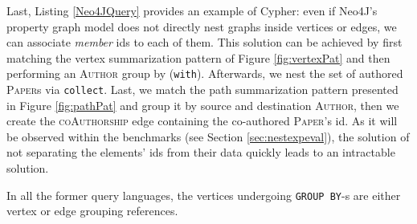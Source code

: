 Last, Listing \ref{Neo4JQuery} provides an example of Cypher: even if Neo4J's property graph model does not directly nest graphs inside vertices or edges, we can associate \textit{member} ids to each of them. This solution can be achieved by  first matching the vertex summarization pattern of Figure \ref{fig:vertexPat} and then performing an \textsc{Author} group by (\texttt{with}). Afterwards, we nest the set of authored \textsc{Paper}s via \texttt{collect}. Last, we match the path summarization pattern presented in Figure \ref{fig:pathPat} and group it by source and destination \textsc{Author}, then we create the \textsc{coAuthorship} edge containing the co-authored \textsc{Paper}'s id. As it will be observed within the benchmarks (see Section \ref{sec:nestexpeval}), the solution of not separating the elements' ids from their data quickly leads to an intractable solution.

In all the former query languages, the vertices undergoing  \texttt{GROUP BY}-s are either vertex or edge grouping references.


